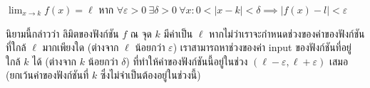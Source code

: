 \begin{definition}
$\lim_{x\to k}{f(x)}=\ell$ หาก $\forall\varepsilon>0\ \exists\delta>0\ \forall x: 0<|x-k|<\delta\implies|f(x)-l|<\varepsilon$
\end{definition}
นิยามนี้กล่าวว่า ลิมิตของฟังก์ชัน $f$ ณ จุด $k$ มีค่าเป็น $\ell$ หากไม่ว่าเราจะกำหนดช่วงของค่าของฟังก์ชันที่ใกล้ $\ell$ มากเพียงใด (ต่างจาก $\ell$ น้อยกว่า $\varepsilon$) เราสามารถหาช่วงของค่า input ของฟังก์ชันที่อยู่ใกล้ $k$ ได้ (ต่างจาก $k$ น้อยกว่า $\delta$) ที่ทำให้ค่าของฟังก์ชันนี้อยู่ในช่วง $(\ell-\varepsilon,\ell+\varepsilon)$ เสมอ (ยกเว้นค่าของฟังก์ชันที่ $k$ ซึ่งไม่จำเป็นต้องอยู่ในช่วงนี้)
